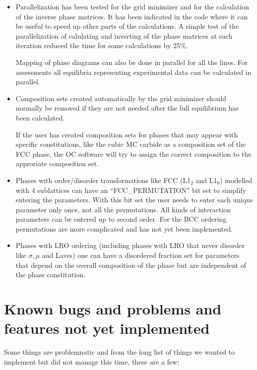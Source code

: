 \documentclass[12pt]{article}
\begin{document}
\begin{enumerate}
\begin{itemize}
\item Parallelization has been tested for the grid minimizer and for
  the calculation of the inverse phase matrices.  It has been
  indicated in the code where it can be useful to speed up other parts
  of the calculations.  A simple test of the parallelization of
  calulating and inverting of the phase matrices at each iteration
  reduced the time for some calculations by 25\%.

  Mapping of phase diagrams can also be done in parallel for all the
  lines.  For assessments all equilibria representing experimental
  data can be calculated in parallel.

\item Composition sets created automatically by the grid minimizer
  should normally be removed if they are not needed after the full
  equilibrium has been calculated.  

  If the user has created composition sets for phases that may appear
  with specific constitutions, like the cubic MC carbide as a
  composition set of the FCC phase, the OC software will try to assign
  the correct composition to the approriate composition set.

\item Phases with order/disorder transformations like FCC (L1$_2$ and
  L1$_0$) modelled with 4 sublattices can have an ``FCC\_PERMUTATION''
  bit set to simplify entering the parameters.  With this bit set the
  user needs to enter each unique parameter only once, not all the
  permutations.  All kinds of interaction parameters can be entered up
  to second order.  For the BCC ordering permutations are more
  complicated and has not yet been implemented.

\item Phases with LRO ordering (including phases with LRO that never
  disorder like $\sigma, \mu$ and Laves) one can have a disordered
  fraction set for parameters that depend on the overall composition
  of the phase but are independent of the phase constitution.
\end{itemize}

\end{enumerate}

\section{Known bugs and problems and features not yet implemented}

Some things are problemnatic and from the long list of things we wanted
to implement but did not manage this time, these are a few:
\end{document}
